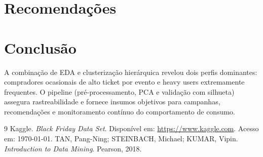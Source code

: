 ﻿\documentclass[12pt]{article}
\begin{document}
\section{Recomendações}

\section{Conclusão}
A combinação de EDA e clusterização hierárquica revelou dois perfis dominantes: compradores ocasionais de alto ticket por evento e heavy users extremamente frequentes. O pipeline (pré-processamento, PCA e validação com silhueta) assegura rastreabilidade e fornece insumos objetivos para campanhas, recomendações e monitoramento contínuo do comportamento de consumo.

\begin{thebibliography}{9}
 Kaggle. \emph{Black Friday Data Set}. Disponível em: \url{https://www.kaggle.com}. Acesso em: \today.
 TAN, Pang-Ning; STEINBACH, Michael; KUMAR, Vipin. \emph{Introduction to Data Mining}. Pearson, 2018.
\end{thebibliography}
\end{document}

